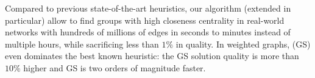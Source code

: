 Compared to previous state-of-the-art heuristics, our algorithm (extended
\growshrink in particular) allow to find groups with high closeness centrality
in real-world networks with hundreds of millions of edges in seconds to minutes
instead of multiple hours, while sacrificing less than $1\%$ in quality. In
weighted graphs, \growshrink (GS) even dominates the best known heuristic: the
GS solution quality is more than $10\%$ higher and GS is two orders of
magnitude faster.
